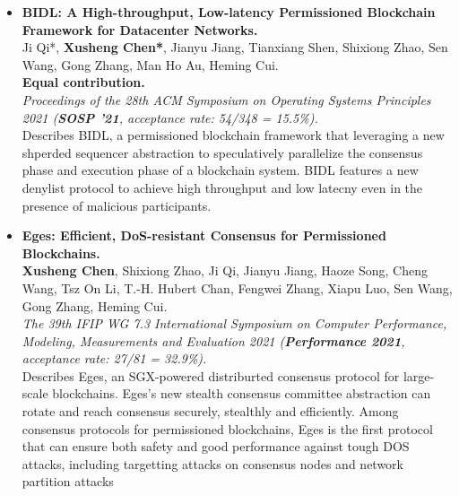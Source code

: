 \documentclass[a4paper,7pt]{article} %
\newcommand{\authors}[1]{{\small \fontfamily{cmss}\selectfont #1}}
\newcommand{\conference}[1]{\textit{\small \fontfamily{cmss}\selectfont #1}}
\newcommand{\info}[1]{{\footnotesize \fontfamily{cmss}\selectfont #1}}
\begin{document}
\begin{itemize}

    \item \textbf{BIDL: A High-throughput, Low-latency Permissioned Blockchain Framework for Datacenter Networks.} \\
    \authors{Ji Qi*, \textbf{Xusheng Chen*}, Jianyu Jiang, Tianxiang Shen, Shixiong Zhao, Sen Wang, Gong Zhang, Man Ho Au, Heming Cui.} \\
    \authors{\bf* Equal contribution.}\\
    \conference{Proceedings of the 28th ACM Symposium on Operating Systems Principles 2021 (\textbf{SOSP '21}, acceptance rate: 54/348 = 15.5\%).} \\
    \info{Describes BIDL, a permissioned blockchain framework that leveraging a new shperded sequencer abstraction to speculatively parallelize the consensus phase and execution phase 
    of a blockchain system. BIDL features a new denylist protocol to achieve high throughput and low latecny even in the presence of 
    malicious participants.}\\

    \item \textbf{Eges: Efficient, DoS-resistant Consensus for Permissioned Blockchains.} \\
    \authors{\textbf{Xusheng Chen}, Shixiong Zhao, Ji Qi,  Jianyu Jiang, Haoze Song, Cheng Wang, Tsz On Li, T.-H. Hubert Chan, Fengwei Zhang, Xiapu Luo, Sen Wang, Gong Zhang, Heming Cui.} \\
    \conference{The 39th IFIP WG 7.3 International Symposium on Computer Performance, Modeling, Measurements and Evaluation 2021 ({\bf Performance 2021}, acceptance rate: 27/81 = 32.9\%).} \\
    \info{Describes Eges, an SGX-powered distriburted consensus protocol for large-scale blockchains. Eges's new stealth consensus committee abstraction can rotate and reach consensus securely, stealthly and efficiently. Among consensus protocols for permissioned blockchains, Eges is the first protocol that can ensure both safety and good performance against tough DOS attacks, including targetting attacks on consensus nodes and network partition attacks} \\



\end{itemize}
\end{document}
